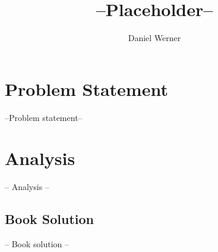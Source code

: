 \documentclass{article}
\title{--Placeholder--}
\author{Daniel Werner}
\begin{document}
\maketitle

\section*{
    Problem Statement
}

--Problem statement--

\section*{
    Analysis
}

-- Analysis --

\subsection* {
  Book Solution
}

-- Book solution --
\end{document}
